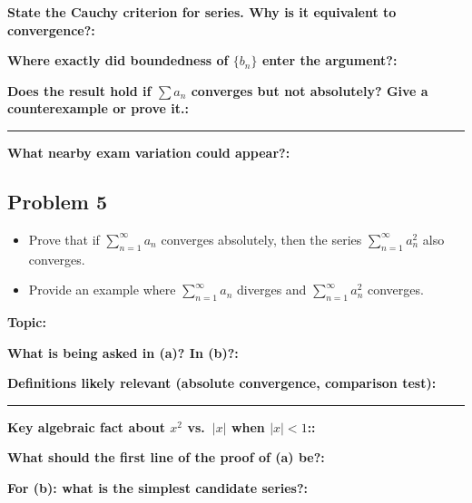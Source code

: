 \documentclass[12pt]{article}
\newcommand{\fillfield}[1]{%
  \par\noindent\textbf{#1:}\enspace\hrulefill\par\vspace{3pt}%
}
\newcommand{\fillfieldlong}[1]{%
  \par\noindent\textbf{#1:}\par\vspace{1.5cm}%
  \noindent\rule{\linewidth}{0.35pt}\par\vspace{4pt}%
}
\begin{document}
\bigskip

\begin{tcolorbox}[
  enhanced, breakable,
  colback  = reflectcyan,
  colframe = cyan!55!black,
  fonttitle = \bfseries,
  title = {\textsc{Reflection \& Variation}}
]
\fillfield{State the Cauchy criterion for series. Why is it equivalent to convergence?}
\fillfield{Where exactly did boundedness of $\{b_n\}$ enter the argument?}
\fillfieldlong{Does the result hold if $\sum a_n$ converges but not absolutely? Give a counterexample or prove it.}
\fillfield{What nearby exam variation could appear?}
\end{tcolorbox}

\newpage
\subsection{Problem 5}

\begin{tcolorbox}[
  enhanced, breakable,
  colback  = probblue,
  colframe = blue!55!black,
  fonttitle = \bfseries,
  title = {\textsc{Problem Statement}\hfill Homework 6, Problem 5}
]
\begin{itemize}[nosep, leftmargin=1.8em]
  \item[(a)] Prove that if $\sum_{n=1}^{\infty} a_n$ converges absolutely, then the series
    $\sum_{n=1}^{\infty} a_n^2$ also converges.
  \item[(b)] Provide an example where $\sum_{n=1}^{\infty} a_n$ diverges and
    $\sum_{n=1}^{\infty} a_n^2$ converges.
\end{itemize}
\end{tcolorbox}

\bigskip

\begin{tcolorbox}[
  enhanced, breakable,
  colback  = pass1green,
  colframe = green!55!black,
  fonttitle = \bfseries,
  title = {Pass 1 \enspace\textbf{--}\enspace First Diagnosis}
]
\fillfield{Topic}
\fillfield{What is being asked in (a)? In (b)?}
\fillfieldlong{Definitions likely relevant (absolute convergence, comparison test)}
\fillfield{Key algebraic fact about $x^2$ vs.\ $|x|$ when $|x| < 1$:}
\fillfield{What should the first line of the proof of (a) be?}
\fillfield{For (b): what is the simplest candidate series?}
\end{tcolorbox}
\end{document}
